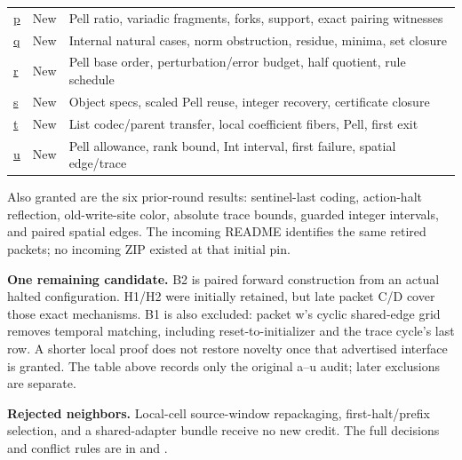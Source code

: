 {\begin{tabularx}{\linewidth}{@{}L{0.48in}L{0.48in}Y@{}}
\href{https://github.com/VladimirReshetnikov/ProveIt/tree/e652d21c413de59e4821f6e8e9b6a3a077bf5bfe/Computability/DiophantineConsistency/research/lean-proof-simplification/2026-10-26p}{p} & New & Pell ratio, variadic fragments, forks, support, exact pairing witnesses \\
\href{https://github.com/VladimirReshetnikov/ProveIt/tree/e652d21c413de59e4821f6e8e9b6a3a077bf5bfe/Computability/DiophantineConsistency/research/lean-proof-simplification/2026-10-26q}{q} & New & Internal natural cases, norm obstruction, residue, minima, set closure \\
\href{https://github.com/VladimirReshetnikov/ProveIt/tree/e652d21c413de59e4821f6e8e9b6a3a077bf5bfe/Computability/DiophantineConsistency/research/lean-proof-simplification/2026-10-26r}{r} & New & Pell base order, perturbation/error budget, half quotient, rule schedule \\
\href{https://github.com/VladimirReshetnikov/ProveIt/tree/e652d21c413de59e4821f6e8e9b6a3a077bf5bfe/Computability/DiophantineConsistency/research/lean-proof-simplification/2026-10-26s}{s} & New & Object specs, scaled Pell reuse, integer recovery, certificate closure \\
\href{https://github.com/VladimirReshetnikov/ProveIt/tree/e652d21c413de59e4821f6e8e9b6a3a077bf5bfe/Computability/DiophantineConsistency/research/lean-proof-simplification/2026-10-26t}{t} & New & List codec/parent transfer, local coefficient fibers, Pell, first exit \\
\href{https://github.com/VladimirReshetnikov/ProveIt/tree/e652d21c413de59e4821f6e8e9b6a3a077bf5bfe/Computability/DiophantineConsistency/research/lean-proof-simplification/2026-10-26u}{u} & New & Pell allowance, rank bound, Int interval, first failure, spatial edge/trace \\
\bottomrule
\end{tabularx}
}

Also granted are the six prior-round results: sentinel-last coding, action-halt reflection, old-write-site color, absolute trace bounds, guarded integer intervals, and paired spatial edges. The incoming README identifies the same retired packets; no incoming ZIP existed at that initial pin.

\textbf{One remaining candidate.} B2 is paired forward construction from an actual halted configuration. H1/H2 were initially retained, but late packet C/D cover those exact mechanisms. B1 is also excluded: packet w's cyclic shared-edge grid removes temporal matching, including reset-to-initializer and the trace cycle's last row. A shorter local proof does not restore novelty once that advertised interface is granted. The table above records only the original a--u audit; later exclusions are separate.

\textbf{Rejected neighbors.} Local-cell source-window repackaging, first-halt/prefix selection, and a  shared-adapter bundle receive no new credit. The full decisions and conflict rules are in  and .
